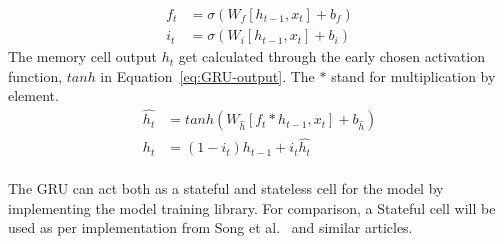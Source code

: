 \begin{equation}
    \begin{split}
        f_t &= \sigma \left (W_{f} \left [h_{t-1}, x_t \right ] + b_f \right ) \\
        i_t &= \sigma \left (W_{i} \left [h_{t-1}, x_t \right ] + b_i \right )
    \end{split}
    \label{eq:GRU-gates}
\end{equation}
The memory cell output $h_t$ get calculated through the early chosen activation function, $tanh$ in \mbox{Equation~\ref{eq:GRU-output}}.
The $\ast$ stand for multiplication by element.
\begin{equation}
    \begin{split}
        \hat{h_t} &= tanh \left (W_{\hat{h}} \left [f_t \ast h_{t-1}, x_t \right] + b_{\hat{h}} \right ) \\
        h_t &= \left (1-i_t \right) h_{t-1}+i_t \hat{h_t}
    \end{split}
    \label{eq:GRU-output}
\end{equation} \\
The GRU can act both as a stateful and stateless cell for the model by implementing the model training library.
For comparison, a Stateful cell will be used as per implementation from Song et al.~\cite{song_lithium-ion_2018} and similar articles.
%
%
%
%

